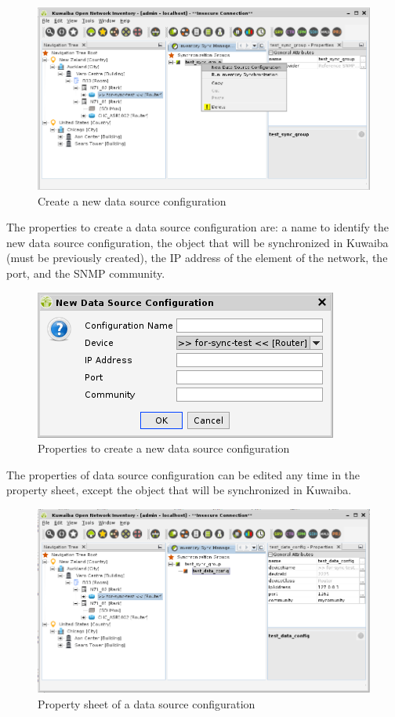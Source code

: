 \documentclass[a4paper]{article}
\begin{document}
			\begin{figure}[h!]
				\centering
				\includegraphics[width=0.8\linewidth]{img/sync_new_data_src_config.png}
				\caption{Create a new data source configuration}
				\label{fig:sync_new_data_src_config}
			\end{figure}
		
			\clearpage		
			
			The properties to create a data source configuration are:
			a name to identify the new data source configuration, the object that will be synchronized in Kuwaiba (must be previously created), the IP address of the element of the network, the port, and the SNMP community.\\
			
			\begin{figure}[h!]
				\centering
				\includegraphics[width=0.4\linewidth]{img/sync_data_src_confg_properties.png}
				\caption{Properties to create a new data source configuration}
				\label{fig:sync_data_src_confg_properties}
			\end{figure}
			
			The properties of data source configuration can be edited any time in the property sheet, except the object that will be synchronized in Kuwaiba.
			
			\begin{figure}[h!]
				\centering
				\includegraphics[width=0.8\linewidth]{img/sync_data_src_confg_property_sheet.png}
				\caption{Property sheet of a data source configuration}
				\label{fig:sync_data_src_confg_property_sheet}
			\end{figure}
		
\end{document}
